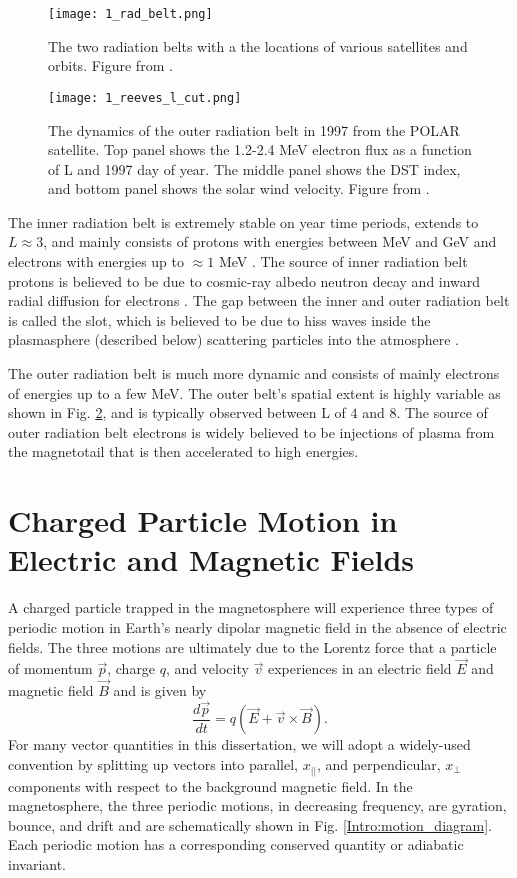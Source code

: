 \begin{figure}
\texttt{[image: 1\_rad\_belt.png]}
\caption{The two radiation belts with a the locations of various satellites and orbits. Figure from \citep{Horne2013}.}
\label{Intro:rad_belts}
\end{figure}

\begin{figure}
\texttt{[image: 1\_reeves\_l\_cut.png]}
\caption{The dynamics of the outer radiation belt in 1997 from the POLAR satellite. Top panel shows the 1.2-2.4 MeV electron flux as a function of L and 1997 day of year. The middle panel shows the DST index, and bottom panel shows the solar wind velocity. Figure from \citep{Reeves2003}.}
\label{Intro:reeves_l_cut}
\end{figure}

The inner radiation belt is extremely stable on year time periods, extends to $L \approx 3$, and mainly consists of protons with energies between MeV and GeV and electrons with energies up to $\approx 1$ MeV \citep{Claudepierre2019}. The source of inner radiation belt protons is believed to be due to cosmic-ray albedo neutron decay \citep[e.g.][]{Li2017_CRAND} and inward radial diffusion for electrons \citep[e.g.][]{O'Brien2016_inner}. The gap between the inner and outer radiation belt is called the slot, which is believed to be due to hiss waves inside the plasmasphere (described below) scattering particles into the atmosphere \citep[e.g.][]{Lyons1973, Breneman2015}.

The outer radiation belt is much more dynamic and consists of mainly electrons of energies up to a few MeV. The outer belt's spatial extent is highly variable as shown in Fig. \ref{Intro:reeves_l_cut}, and is typically observed between L of $4$ and $8$. The source of outer radiation belt electrons is widely believed to be injections of plasma from the magnetotail that is then accelerated to high energies.

\section{Charged Particle Motion in Electric and Magnetic Fields}\label{Intro:particle_motion}
A charged particle trapped in the magnetosphere will experience three types of periodic motion in Earth's nearly dipolar magnetic field in the absence of electric fields. The three motions are ultimately due to the Lorentz force that a particle of momentum $\vec{p}$, charge $q$, and velocity $\vec{v}$ experiences in an electric field $\vec{E}$ and magnetic field $\vec{B}$ and is given by
\begin{equation} \label{Intro:Lorentz}
\frac{d\vec{p}}{dt} = q(\vec{E} + \vec{v} \times \vec{B}).
\end{equation} For many vector quantities in this dissertation, we will adopt a widely-used convention by splitting up vectors into parallel, $x_{||}$, and perpendicular, $x_\perp$ components with respect to the background magnetic field. In the magnetosphere, the three periodic motions, in decreasing frequency, are gyration, bounce, and drift and are schematically shown in Fig. \ref{Intro:motion_diagram}. Each periodic motion has a corresponding conserved quantity or adiabatic invariant. 

